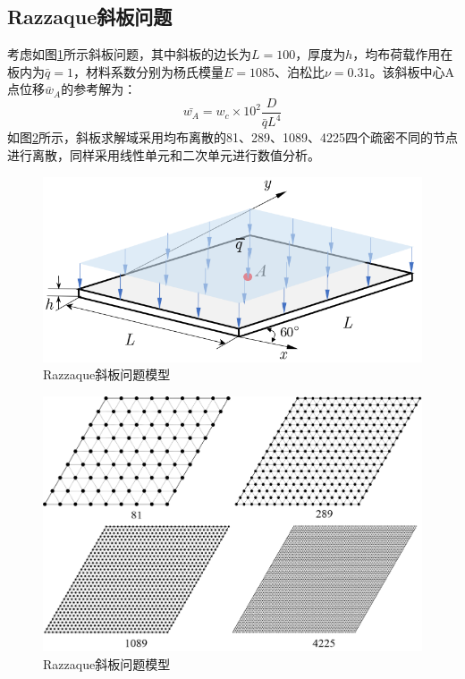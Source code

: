  \subsection{Razzaque斜板问题}
考虑如图\ref{ch_5:fig:xieplate}所示斜板问题，其中斜板的边长为$L=100$，厚度为$h$，均布荷载作用在板内为$\bar{q}=1$，材料系数分别为杨氏模量$E=1085$、泊松比$\nu=0.31$。该斜板中心A点位移$\bar w_A$的参考解为：
\begin{equation} 
    \bar{w_A}=w_c\times10^2\frac{D}{\bar{q}L^4}
\end{equation}
如图\ref{ch_5:fig:xieplatemsh}所示，斜板求解域采用均布离散的81、289、1089、4225四个疏密不同的节点进行离散，同样采用线性单元和二次单元进行数值分析。
\begin{figure}[!h]
    \centering 
        \includegraphics[scale=0.6]{figures/shearlocking/xie plate.png}
        \caption{Razzaque斜板问题模型}\label{ch_5:fig:xieplate}
\end{figure}
\begin{figure}[!h]
    \centering 
        \includegraphics[scale=0.5]{figures/shearlocking/xieplatemsh.png}
        \caption{Razzaque斜板问题模型}\label{ch_5:fig:xieplatemsh}
\end{figure}
